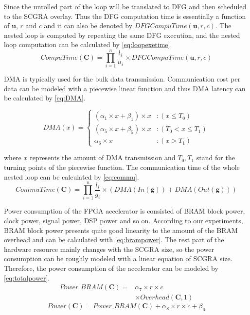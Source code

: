 Since the unrolled part of the loop will be translated to 
DFG and then scheduled to the SCGRA overlay. Thus the DFG computation time 
is essentially a function of $\mathbf{u}$, $r$ and $c$ and it can also be 
denoted by $DFGCompuTime(\mathbf{u},r,c)$.
The nested loop is computed by repeating the same DFG execution, and the 
nested loop computation can be calculated by \eqref{eq:loopexetime}.
\begin{equation} \label{eq:loopexetime}
    CompuTime(\bm{C})=\displaystyle \prod_{i=1}^{n} \frac{l_i}{u_i} \times DFGCompuTime(\mathbf{u},r,c)
\end{equation}

DMA is typically used for the bulk data transmission. Communication cost per 
data can be modeled with a piecewise linear function and thus DMA latency can be 
calculated by \eqref{eq:DMA}.

\begin{equation} \label{eq:DMA}
    DMA(x)=%
    \begin{cases}
        (\alpha_1\times x + \beta_1) \times x &: (x \leq T_0) \\
        (\alpha_5\times x + \beta_5) \times x &: (T_0 < x \leq T_1) \\
        \alpha_6\times x &: (x > T_1)
    \end{cases}
\end{equation}

where $x$ represents the amount of DMA transmission and $T_0, T_1$ stand for 
the turning points of the piecewise function. The communication time of the 
whole nested loop can be calculated by \eqref{eq:commu}.
\begin{equation} \label{eq:commu}
    CommuTime(\bm{C})=\displaystyle \prod_{i=1}^{n} \frac{l_i}{g_i} \times 
    (DMA(In(\mathbf{g}))+DMA(Out(\mathbf{g})))
\end{equation}

Power consumption of the FPGA accelerator is consisted of 
BRAM block power, clock power, signal power, DSP power and so on. 
According to our experiments, BRAM block power presents quite 
good linearity to the amount of 
the BRAM overhead and can be calculated with \eqref{eq:brampower}. 
The rest part of the hardware resource mainly changes with the SCGRA size, 
so the power consumption can be roughly modeled with a linear 
equation of SCGRA size. Therefore, the power consumption 
of the accelerator can be modeled by \eqref{eq:totalpower}.
\begin{equation} \label{eq:brampower}
    \begin{split}
        Power\_BRAM(\bm{C})=&\alpha_7 \times r \times c \\ 
        &\times Overhead(\bm{C}, 1)
    \end{split}
\end{equation}
\begin{equation} \label{eq:totalpower}
    Power(\bm{C})=Power\_BRAM(\bm{C})+\alpha_8 \times r \times c + \beta_6
\end{equation}

